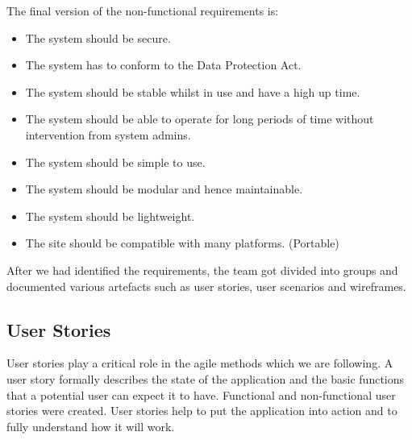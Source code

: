 \documentclass{l3proj}
\begin{document}
The final version of the non-functional requirements is:
\begin{itemize}
\item The system should be secure.
\item The system has to conform to the Data Protection Act.
\item The system should be stable whilst in use and have a high up time.
\item The system should be able to operate for long periods of time without intervention from system admins.
\item The system should be simple to use.
\item The system should be modular and hence maintainable.
\item The system should be lightweight.
\item The site should be compatible with many platforms. (Portable)

\end{itemize}

After we had identified the requirements, the team got divided into groups and documented various artefacts such as user stories, user scenarios and wireframes.

\subsection{User Stories}
\label{user_stories}

User stories \cite{UserStories} play a critical role in the agile methods which we are following. A user story formally describes the state of the application and the basic functions that a potential user can expect it to have. Functional and non-functional user stories were created. User stories help to put the application into action and to fully understand how it will work.
\end{document}
